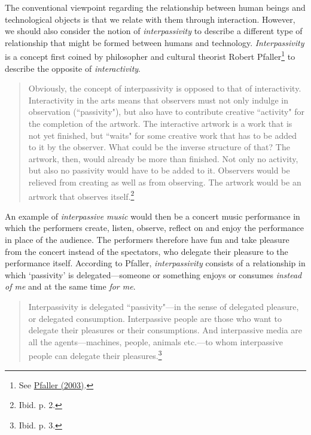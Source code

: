 The conventional viewpoint regarding the relationship between human beings and technological objects is that we relate with them through interaction. However, we should also consider the notion of \emph{interpassivity} to describe a different type of relationship that might be formed between humans and technology. \emph{Interpassivity} is a concept first coined by philosopher and cultural theorist Robert Pfaller\footnote{See \hyperlink{pfaller}{Pfaller (2003)}.} to describe the opposite of \emph{interactivity}.
\begin{quote}
Obviously, the concept of interpassivity is opposed to that of interactivity. Interactivity in the arts means that observers must not only indulge in observation (``passivity"), but also have to contribute creative ``activity" for the completion of the artwork. The interactive artwork is a work that is not yet finished, but ``waits" for some creative work that has to be added to it by the observer. What could be the inverse structure of that? The artwork, then, would already be more than finished. Not only no activity, but also no passivity would have to be added to it. Observers would be relieved from creating as well as from observing. The artwork would be an artwork that observes itself.\footnote{Ibid. p. 2.}
\end{quote}
An example of \emph{interpassive music} would then be a concert music performance in which the performers create, listen, observe, reflect on and enjoy the performance in place of the audience. The performers therefore have fun and take pleasure from the concert instead of the spectators, who delegate their pleasure to the performance itself. According to Pfaller, \emph{interpassivity} consists of a relationship in which `passivity' is delegated---someone or something enjoys or consumes \emph{instead of me} and at the same time \emph{for me}. 
\begin{quote}
Interpassivity is delegated ``passivity"---in the sense of delegated pleasure, or delegated consumption. Interpassive people are those who want to delegate their pleasures or their consumptions. And interpassive media are all the agents---machines, people, animals etc.---to whom interpassive people can delegate their pleasures.\footnote{Ibid. p. 3.}
\end{quote}

